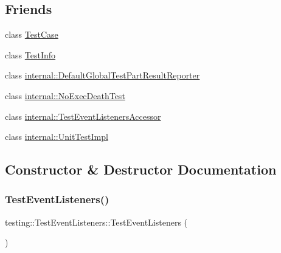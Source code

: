 \subsection*{Friends}
\begin{DoxyCompactItemize}
\item 
class \mbox{\hyperlink{classtesting_1_1TestEventListeners_aff779e55b06adfa7c0088bd10253f0f0}{Test\+Case}}
\item 
class \mbox{\hyperlink{classtesting_1_1TestEventListeners_a4c49c2cdb6c328e6b709b4542f23de3c}{Test\+Info}}
\item 
class \mbox{\hyperlink{classtesting_1_1TestEventListeners_abae39633da9932847b41cb80efd62115}{internal\+::\+Default\+Global\+Test\+Part\+Result\+Reporter}}
\item 
class \mbox{\hyperlink{classtesting_1_1TestEventListeners_afddba49fdf3f493532b4d5efb9814f4e}{internal\+::\+No\+Exec\+Death\+Test}}
\item 
class \mbox{\hyperlink{classtesting_1_1TestEventListeners_addbc107b6b445617c880182bd4f44cf9}{internal\+::\+Test\+Event\+Listeners\+Accessor}}
\item 
class \mbox{\hyperlink{classtesting_1_1TestEventListeners_acc0a5e7573fd6ae7ad1878613bb86853}{internal\+::\+Unit\+Test\+Impl}}
\end{DoxyCompactItemize}


\subsection{Constructor \& Destructor Documentation}
\mbox{\label{classtesting_1_1TestEventListeners_af0716e4067a6f357ee5ea18802a591dd}} 
\subsubsection{\texorpdfstring{TestEventListeners()}{TestEventListeners()}}
{\footnotesize\ttfamily testing\+::\+Test\+Event\+Listeners\+::\+Test\+Event\+Listeners (\begin{DoxyParamCaption}{ }\end{DoxyParamCaption})}

\mbox{\label{classtesting_1_1TestEventListeners_abe9fbbbedf7f55fa898abfae60aa4913}} 
